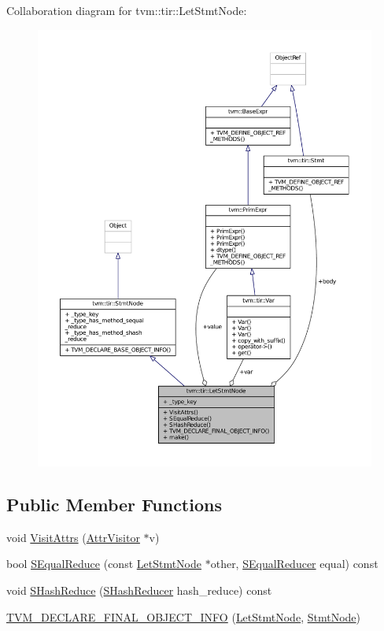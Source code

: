 Collaboration diagram for tvm\+:\+:tir\+:\+:Let\+Stmt\+Node\+:
\nopagebreak
\begin{figure}[H]
\begin{center}
\leavevmode
\includegraphics[width=350pt]{classtvm_1_1tir_1_1LetStmtNode__coll__graph}
\end{center}
\end{figure}
\subsection*{Public Member Functions}
\begin{DoxyCompactItemize}
\item 
void \hyperlink{classtvm_1_1tir_1_1LetStmtNode_a71dbfcfb3e13a23cd22528b167568e24}{Visit\+Attrs} (\hyperlink{classtvm_1_1AttrVisitor}{Attr\+Visitor} $\ast$v)
\item 
bool \hyperlink{classtvm_1_1tir_1_1LetStmtNode_a4c640ef89fb13700a44a1c61e0b477ea}{S\+Equal\+Reduce} (const \hyperlink{classtvm_1_1tir_1_1LetStmtNode}{Let\+Stmt\+Node} $\ast$other, \hyperlink{classtvm_1_1SEqualReducer}{S\+Equal\+Reducer} equal) const 
\item 
void \hyperlink{classtvm_1_1tir_1_1LetStmtNode_a0517cf139df41a3876410b0a37da27b7}{S\+Hash\+Reduce} (\hyperlink{classtvm_1_1SHashReducer}{S\+Hash\+Reducer} hash\+\_\+reduce) const 
\item 
\hyperlink{classtvm_1_1tir_1_1LetStmtNode_aa5672c07c91b8b4b2ba4f8607a82df01}{T\+V\+M\+\_\+\+D\+E\+C\+L\+A\+R\+E\+\_\+\+F\+I\+N\+A\+L\+\_\+\+O\+B\+J\+E\+C\+T\+\_\+\+I\+N\+FO} (\hyperlink{classtvm_1_1tir_1_1LetStmtNode}{Let\+Stmt\+Node}, \hyperlink{classtvm_1_1tir_1_1StmtNode}{Stmt\+Node})
\end{DoxyCompactItemize}
